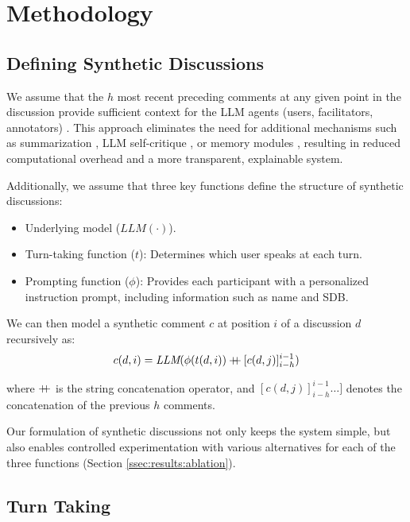 %

\section{Methodology}
\label{sec:methodology}

\subsection{Defining Synthetic Discussions}
\label{ssec:methodology:discussions}

We assume that the $h$ most recent preceding comments at any given point in the discussion provide sufficient context for the \ac{LLM} agents (users, facilitators, annotators) \cite{pavlopoulos_2020_toxicity}. This approach eliminates the need for additional mechanisms such as summarization \cite{balog_2024}, \ac{LLM} self-critique \cite{yu_2024_fincon}, or memory modules \cite{Vezhnevets2023GenerativeAM}, resulting in reduced computational overhead and a more transparent, explainable system.

Additionally, we assume that three key functions define the structure of synthetic discussions:
\begin{itemize}[nosep, noitemsep]
    \item Underlying model ($\textit{LLM}(\cdot)$).
    \item Turn-taking function ($t$): Determines which user speaks at each turn.
    \item Prompting function ($\phi$): Provides each participant with a personalized instruction prompt, including information such as name and \ac{SDB}.
\end{itemize}

We can then model a synthetic comment $c$ at position $i$ of a discussion $d$ recursively as:
\begin{equation}
\label{eq:comment}
    c(d, i) = \textit{LLM}(\phi(t(d, i)) \mathbin{{+}\mspace{-8mu}{+}} [c(d, j)]^{i-1}_{i-h})
\end{equation}

\noindent where $\mathbin{{+}\mspace{-8mu}{+}}$ is the string concatenation operator, and $[c(d,j)]_{i-h}^{i-1}\dots]$ denotes the concatenation of the previous $h$ comments.

Our formulation of synthetic discussions not only keeps the system simple, but also enables controlled experimentation with various alternatives for each of the three functions (Section \ref{ssec:results:ablation}).


\subsection{Turn Taking}
\label{ssec:experimental:turn}

